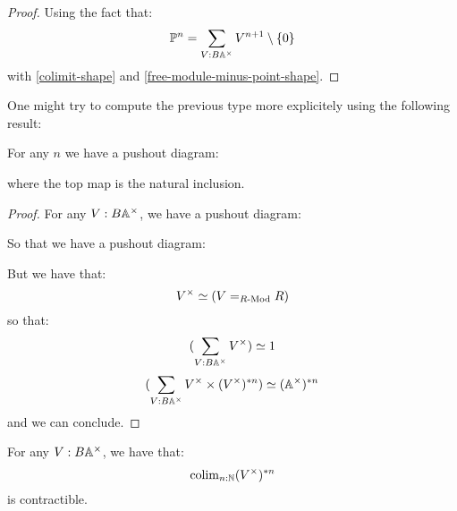 \begin{proof}
Using the fact that:
\[\mathbb{P}^n = \sum_{V:B\mathbb{A}^\times} V^{n+1}\setminus\{0\}\]
with \cref{colimit-shape} and \cref{free-module-minus-point-shape}.
\end{proof}

One might try to compute the previous type more explicitely using the following result:

\begin{lemma}
For any $n$ we have a pushout diagram:
 \begin{center}
  \end{center}
  where the top map is the natural inclusion.
\end{lemma}

\begin{proof}
For any $V:B\mathbb{A}^\times$, we have a pushout diagram:
   \begin{center}
  \end{center}
  So that we have a pushout diagram:
     \begin{center}
  \end{center}
  But we have that:
  \[V^\times \simeq (V=_{R\text{-}\mathrm{Mod}}R)\]
  so that:
  \[ (\sum_{V:B\mathbb{A}^\times}V^\times) \simeq 1\]
  \[ (\sum_{V:B\mathbb{A}^\times}V^\times\times (V^\times)^{*n}) \simeq (\mathbb{A}^\times)^{*n}\]
  and we can conclude.
\end{proof}

\begin{lemma}\label{infinite-sphere-contractible}
For any $V:B\mathbb{A}^\times$, we have that:
\[\mathrm{colim}_{n:\mathbb{N}} (V^\times)^{*n}\]
is contractible.
\end{lemma}

